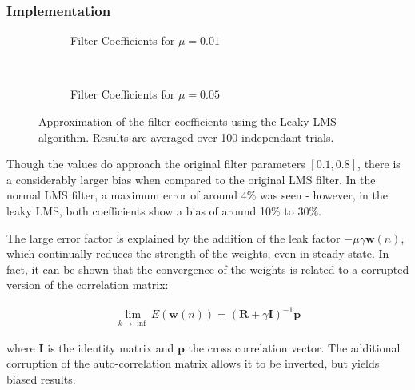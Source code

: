 \documentclass[main.tex]{subfiles}
\begin{document}
\subsubsection{Implementation}

\begin{figure}[H]
	\centering
	\begin{subfigure}[b]{0.45\textwidth}
		\resizebox{\textwidth}{!}{}
		\caption{Filter Coefficients for $\mu = 0.01$}
	\end{subfigure}%
	~ %
	\begin{subfigure}[b]{0.45\textwidth}
		\resizebox{\textwidth}{!}{}
		\caption{Filter Coefficients for $\mu = 0.05$}
	\end{subfigure}
	\caption{Approximation of the filter coefficients using the Leaky LMS algorithm. Results are averaged over 100 independant trials.}
	\label{fig:animals}
\end{figure}



Though the values do approach the original filter parameters $[0.1, 0.8]$, there is a considerably larger bias when compared to the original LMS filter. In the normal LMS filter, a maximum error of around 4\% was seen - however, in the leaky LMS, both coefficients show a bias of around 10\% to 30\%.

The large error factor is explained by the addition of the leak factor $-\mu\gamma\textbf{w}(n)$, which continually reduces the strength of the weights, even in steady state. In fact, it can be shown that the convergence of the weights is related to a corrupted version of the correlation matrix\cite{Kamenetsky2004}:

\begin{align*}
\lim_{k \to \inf}E(\textbf{w}(n)) = (\textbf{R} + \gamma \textbf{I})^{-1}\textbf{p}
\end{align*}

where $\textbf{I}$ is the identity matrix and $\textbf{p}$ the cross correlation vector. The additional corruption of the auto-correlation matrix allows it to be inverted, but yields biased results.
\end{document}
